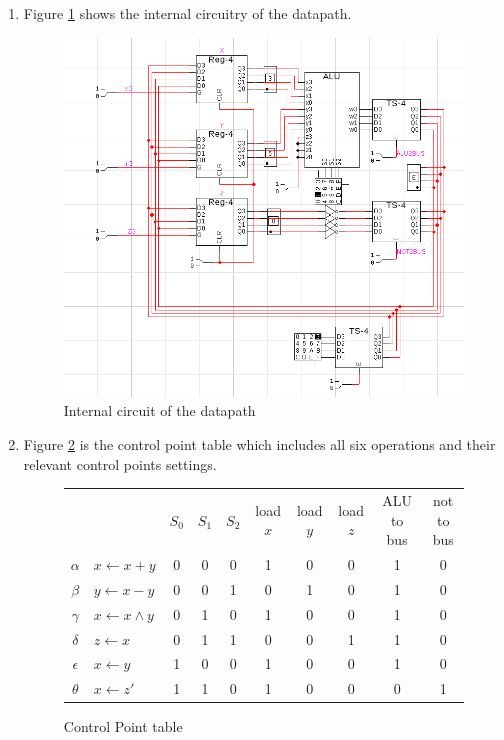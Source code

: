 \documentclass{article}
\begin{document}
\begin{enumerate}
    \item{
      Figure \ref{dpcirc} shows the internal circuitry of the datapath.
      \begin{figure}[h]
        \centering
        \includegraphics[width=300pt]{img/datapath}
        \caption{\label{dpcirc} Internal circuit of the datapath}
      \end{figure}
    }

    \item{
      Figure \ref{cptt} is the control point table which includes all six
      operations and their relevant control points settings.
      \begin{figure}[h]
        \centering
        \begin{tabular}[h]{c l | c c c c c c c c }
          && $S_{0}$ & $S_{1}$ & $S_{2}$ & load $x$ & load $y$ & load $z$ & ALU to bus & not to bus \\
          $\alpha$ & $x\leftarrow x+y$ & 0 & 0 & 0 & 1 & 0 & 0 & 1 & 0\\
          $\beta$ & $y\leftarrow x-y$ & 0 & 0 & 1 & 0 & 1 & 0 & 1 & 0 \\
          $\gamma$ & $x\leftarrow x\land y$ & 0 & 1 & 0 & 1 & 0 & 0 & 1 & 0 \\
          $\delta$ & $z\leftarrow x$ & 0 & 1 & 1 & 0 & 0 & 1 & 1 & 0 \\
          $\epsilon$ & $x\leftarrow y$ & 1 & 0 & 0 & 1 & 0 & 0 & 1 & 0 \\
          $\theta$ & $x\leftarrow z'$ & 1 & 1 & 0 & 1 & 0 & 0 & 0 & 1 \\
        \end{tabular}
        \caption{\label{cptt} Control Point table}
      \end{figure}

}
\end{enumerate}
\end{document}
